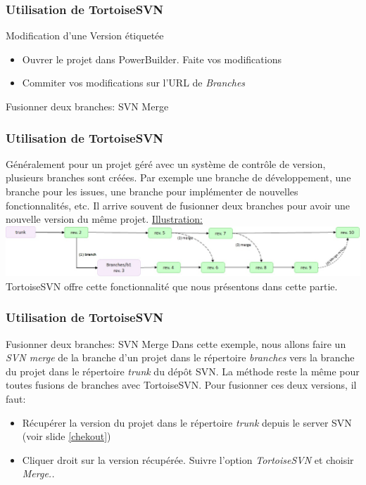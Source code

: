 \documentclass{beamer}
\begin{document}
\begin{frame}
\frametitle{Utilisation de TortoiseSVN}
\begin{block}{Modification d'une Version étiquetée}
\begin{itemize}
\item Ouvrer le projet dans PowerBuilder. Faite vos modifications
\item Commiter vos modifications sur l'URL de \alert{\textit{Branches}}
\end{itemize}
\end{block}
\end{frame}


\begin{frame}
\begin{center}
\huge{Fusionner deux branches: SVN Merge}
\end{center}
\end{frame}


\begin{frame}
\frametitle{Utilisation de TortoiseSVN}
Généralement pour un projet géré avec un système de contrôle de version, plusieurs branches sont créées. Par exemple une branche de développement, une branche pour les issues, une branche pour implémenter de nouvelles fonctionnalités, etc.  Il arrive souvent de fusionner deux branches pour avoir une nouvelle version du même projet. 
\newline
\newline
\alert{\underline{Illustration:}}
\newline
\newline
\includegraphics[scale=.5]{../images/merge.jpg}
\newline
TortoiseSVN offre cette fonctionnalité que nous présentons dans cette partie. 
\end{frame}

\begin{frame}
\frametitle{Utilisation de TortoiseSVN}
\begin{block}{Fusionner deux branches: SVN Merge}
Dans cette exemple, nous allons faire un \alert{\textit{SVN merge}}  de la branche d'un projet dans le répertoire \alert{\textit{branches}} vers la branche du projet dans le répertoire \alert{\textit{trunk}} du dépôt SVN. La méthode reste la même pour toutes fusions de branches avec TortoiseSVN.  Pour  fusionner ces deux versions, il faut:
\begin{itemize}
\item Récupérer la version du projet dans le répertoire \alert{\textit{trunk}} depuis le server SVN (voir slide \ref{chekout})
\item Cliquer droit sur la version récupérée. Suivre l'option  \alert{\textit{TortoiseSVN}} et choisir \alert{\textit{Merge..}}
\end{itemize}
\end{block} 
\end{frame}
\end{document}
